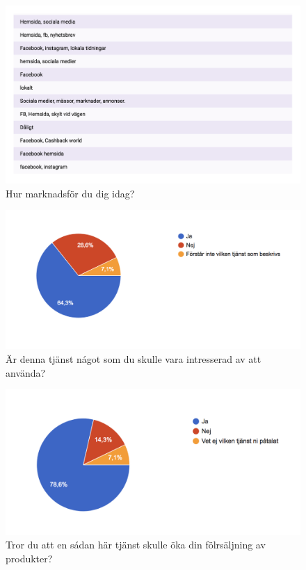 \documentclass[10pt,a4paper,oneside]{article}
\begin{document}
\begin{figure}
	\includegraphics[scale=0.6]{8.png}
	\caption{Hur marknadsf\"or du dig idag?}
\end{figure}

\begin{figure}
	\includegraphics[scale=0.6]{9.png}
	\caption{\"Ar denna tj\"anst n\'agot som du skulle vara intresserad av att anv\"anda?}
\end{figure}

\begin{figure}
	\includegraphics[scale=0.6]{10.png}
	\caption{Tror du att en s\'adan h\"ar tj\"anst skulle \"oka din f\"olrs\"aljning av produkter?}
\end{figure}
\end{document}
